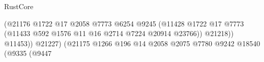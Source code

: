 \begin{lexlean}{RustCore}
\begin{coremodule}
                                                                      (@21176
                                                                        @1722
                                                                        @17
                                                                        @2058
                                                                        @7773
                                                                        @6254
                                                                        @9245
                                                                        (@11428
                                                                          @1722
                                                                          @17
                                                                          @7773
                                                                          (@11433
                                                                            @592
                                                                            @1576
                                                                            @11
                                                                            @16
                                                                            @2714
                                                                            @7224
                                                                            @20914
                                                                            @23766))
                                                                        @21218))
                                                                    @11453))
                                                                @21227)
                                                              (@21175
                                                                @1266
                                                                @196
                                                                @14
                                                                @2058
                                                                @2075
                                                                @7780
                                                                @9242
                                                                @18540
                                                                (@9335
                                                                  (@9447

\end{coremodule}
\end{lexlean}
